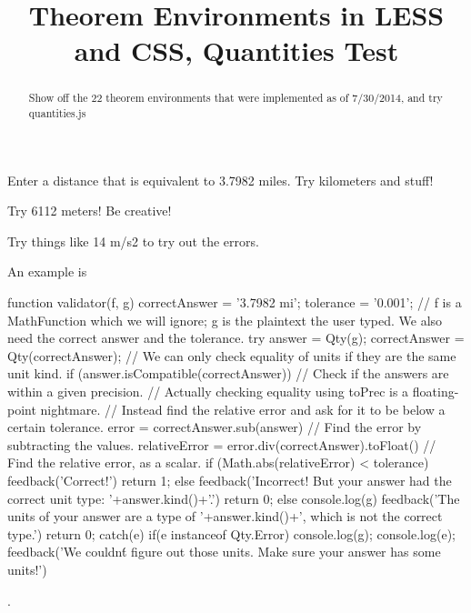 \documentclass{ximera}
\begin{document}
\begin{abstract}
Show off the 22 theorem environments that were implemented as of 7/30/2014, and try quantities.js
\end{abstract}

\title{Theorem Environments in LESS and CSS, Quantities Test}


\begin{exercise}
Enter a distance that is equivalent to 3.7982 miles. Try kilometers and stuff!

\begin{solution}
\begin{hint}
Try 6112 meters! Be creative!
\end{hint}
\begin{hint}
Try things like 14 m/s2 to try out the errors.
\end{hint}
An example is \begin{expression-answer}
	
	
	function validator(f, g) {
		correctAnswer = '3.7982 mi';
		tolerance = '0.001';
		// f is a MathFunction which we will ignore; g is the plaintext the user typed. We also need the correct answer and the tolerance.		
		try {
			answer = Qty(g);
			correctAnswer = Qty(correctAnswer);   
			// We can only check equality of units if they are the same unit kind.
			if (answer.isCompatible(correctAnswer))
			{
				// Check if the answers are within a given precision. 
				// Actually checking equality using toPrec is a floating-point nightmare.
				// Instead find the relative error and ask for it to be below a certain tolerance.
				error = correctAnswer.sub(answer)		 	// Find the error by subtracting the values.
				relativeError = error.div(correctAnswer).toFloat()  // Find the relative error, as a scalar.
				if (Math.abs(relativeError) < tolerance) {
					feedback('Correct!')
					return 1;
				} else {
					feedback('Incorrect! But your answer had the correct unit type: '+answer.kind()+'.')
					return 0;
				}
			} else {
				console.log(g)
				feedback('The units of your answer are a type of '+answer.kind()+', which is not the correct type.')
				return 0;
			}
		}
		catch(e) {
		  if(e instanceof Qty.Error) {
			console.log(g);
			console.log(e);
			feedback('We couldn\'t figure out those units. Make sure your answer has some units!')
		  }
		}
	}

	

\end{expression-answer}.
\end{solution}

\end{exercise}
\end{document}
